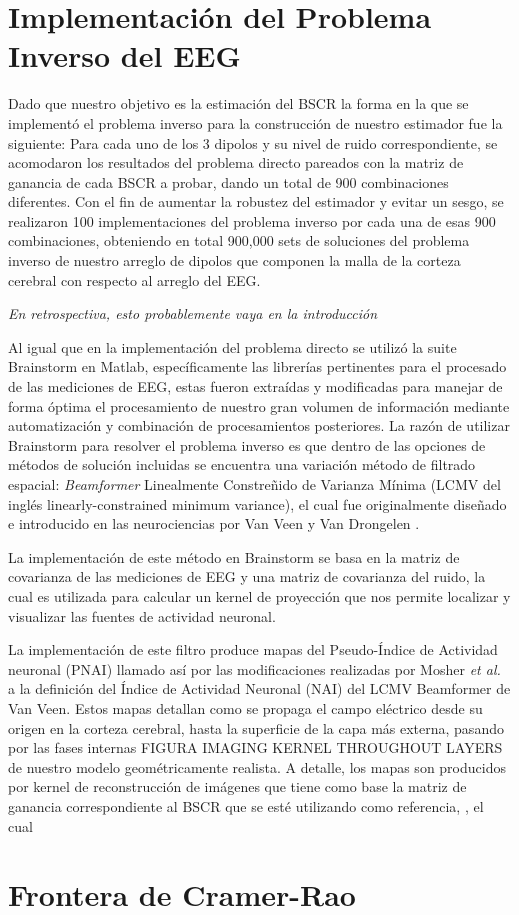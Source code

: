 \section{Implementación del Problema Inverso del EEG}
\label{sec:methodology:inverse_solved}

Dado que nuestro objetivo es la estimación del BSCR la forma en la que se implementó el problema inverso para la construcción de nuestro estimador fue la siguiente: Para cada uno de los 3 dipolos y su nivel de ruido correspondiente, se acomodaron los resultados del problema directo pareados con la matriz de ganancia de cada BSCR a probar, dando un total de 900 combinaciones diferentes. Con el fin de aumentar la robustez del estimador y evitar un sesgo, se realizaron 100 implementaciones del problema inverso por cada una de esas 900 combinaciones, obteniendo en total 900,000 sets de soluciones del problema inverso de nuestro arreglo de dipolos que componen la malla de la corteza cerebral con respecto al arreglo del EEG.

\emph{En retrospectiva, esto probablemente vaya en la introducción}

Al igual que en la implementación del problema directo se utilizó la suite Brainstorm en Matlab, específicamente las librerías pertinentes para el procesado de las mediciones de EEG, estas fueron extraídas y modificadas para manejar de forma óptima el procesamiento de nuestro gran volumen de información mediante automatización y combinación de procesamientos posteriores. La razón de utilizar Brainstorm para resolver el problema inverso es que dentro de las opciones de métodos de solución incluidas se encuentra una variación método de filtrado espacial: \emph{Beamformer} Linealmente Constreñido de Varianza Mínima (LCMV del inglés linearly-constrained minimum variance), el cual fue originalmente diseñado e introducido en las neurociencias por Van Veen y Van Drongelen \cite{VanVeen1988, VanVeen1997}. 


La implementación de este método en Brainstorm se basa en la matriz de covarianza de las mediciones de EEG y una matriz de covarianza del ruido, la cual es utilizada para calcular un kernel de proyección que nos permite localizar y visualizar las fuentes de actividad neuronal.

La implementación de este filtro produce mapas del Pseudo-Índice de Actividad neuronal (PNAI) llamado así por las modificaciones realizadas por Mosher \emph{et al.}\cite{Jaiswal2020} a la definición del Índice de Actividad Neuronal (NAI) del LCMV Beamformer de Van Veen. Estos mapas detallan como se propaga el campo eléctrico desde su origen en la corteza cerebral, hasta la superficie de la capa más externa, pasando por las fases internas FIGURA IMAGING KERNEL THROUGHOUT LAYERS de nuestro modelo geométricamente realista. A detalle, los mapas son producidos por kernel de reconstrucción de imágenes que tiene como base la matriz de ganancia correspondiente al BSCR que se esté utilizando como referencia,  , el cual 






\section{Frontera de Cramer-Rao}
\label{sec:system:conclusion}



